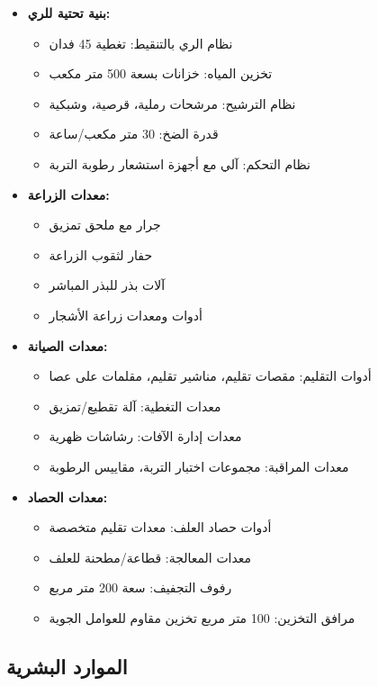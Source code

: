 \begin{itemize}
    \item \textbf{بنية تحتية للري:}
    \begin{itemize}
        \item نظام الري بالتنقيط: تغطية 45 فدان
        \item تخزين المياه: خزانات بسعة 500 متر مكعب
        \item نظام الترشيح: مرشحات رملية، قرصية، وشبكية
        \item قدرة الضخ: 30 متر مكعب/ساعة
        \item نظام التحكم: آلي مع أجهزة استشعار رطوبة التربة
    \end{itemize}
    \item \textbf{معدات الزراعة:}
    \begin{itemize}
        \item جرار مع ملحق تمزيق
        \item حفار لثقوب الزراعة
        \item آلات بذر للبذر المباشر
        \item أدوات ومعدات زراعة الأشجار
    \end{itemize}
    \item \textbf{معدات الصيانة:}
    \begin{itemize}
        \item أدوات التقليم: مقصات تقليم، مناشير تقليم، مقلمات على عصا
        \item معدات التغطية: آلة تقطيع/تمزيق
        \item معدات إدارة الآفات: رشاشات ظهرية
        \item معدات المراقبة: مجموعات اختبار التربة، مقاييس الرطوبة
    \end{itemize}
    \item \textbf{معدات الحصاد:}
    \begin{itemize}
        \item أدوات حصاد العلف: معدات تقليم متخصصة
        \item معدات المعالجة: قطاعة/مطحنة للعلف
        \item رفوف التجفيف: سعة 200 متر مربع
        \item مرافق التخزين: 100 متر مربع تخزين مقاوم للعوامل الجوية
    \end{itemize}
\end{itemize}

\subsection{الموارد البشرية}

